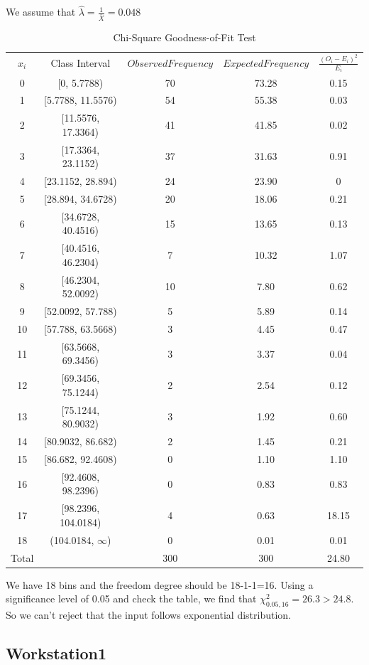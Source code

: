 \documentclass{article}
\begin{document}
We assume that $\hat{\lambda}=\frac{1}{\bar{X}}=0.048$
\begin{table}[htp]
\caption{Chi-Square Goodness-of-Fit Test}
\begin{center}
\begin{tabular}{ccccc}
\hline
$x_i$ & Class Interval & $Observed Frequency$ & $Expected Frequency$ & $\frac{(O_i-E_i)^2}{E_i}$\\
0&[0, 5.7788)&70&73.28&0.15\\
1&[5.7788, 11.5576)&54&55.38&0.03\\
2&[11.5576, 17.3364)&41&41.85&0.02\\
3&[17.3364, 23.1152)&37&31.63&0.91\\
4&[23.1152, 28.894)&24&23.90&0\\
5&[28.894, 34.6728)&20&18.06&0.21\\
6&[34.6728, 40.4516)&15&13.65&0.13\\
7&[40.4516, 46.2304)&7&10.32&1.07\\
8&[46.2304, 52.0092)&10&7.80&0.62\\
9&[52.0092, 57.788)&5&5.89&0.14\\
10&[57.788, 63.5668)&3&4.45&0.47\\
11&[63.5668, 69.3456)&3&3.37&0.04\\
12&[69.3456, 75.1244)&2&2.54&0.12\\
13&[75.1244, 80.9032)&3&1.92&0.60\\
14&[80.9032, 86.682)&2&1.45&0.21\\
15&[86.682, 92.4608)&0&1.10&1.10\\
16&[92.4608, 98.2396)&0&0.83&0.83\\
17&[98.2396, 104.0184)&4&0.63&18.15\\
18&(104.0184, $\infty$)&0&0.01&0.01\\
\hline
Total& &300&300&24.80\\

\hline

\end{tabular}
\end{center}
\label{default}
\end{table}%

We have 18 bins and the freedom degree should be 18-1-1=16. Using a significance level of 0.05 and check the table, we find that $\chi^2_{0.05, 16}=26.3 > 24.8$. So we can't reject that the input follows exponential distribution.



\subsection{Workstation1}
\end{document}

